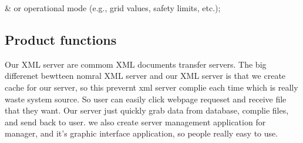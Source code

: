 & or operational mode (e.g., grid values, safety limits, etc.);

\subsection{Product functions}
Our XML server are commom XML documents transfer servers. The big differenet bewtteen nomral XML server and our XML server is that
we create cache for our server, so this prevernt xml server complie each time which is really waste system source.
So user can easily click webpage requeset and receive file that they want. Our server just quickly grab data from database, complie files, and send back to user.
we also create server management application for manager, and it's graphic interface application, so people really easy to use.

% 


